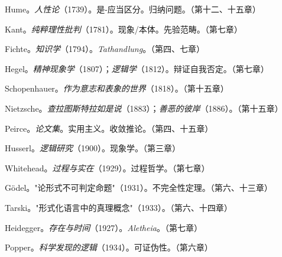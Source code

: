 \documentclass[10pt, openany, oneside]{book}
\begin{document}
{\noindent Hume。\textit{人性论}（1739）。是-应当区分。归纳问题。（第十二、十五章）

\vspace{0.3em}

\noindent Kant。\textit{纯粹理性批判}（1781）。现象/本体。先验范畴。（第七章）

\vspace{0.3em}

\noindent Fichte。\textit{知识学}（1794）。\textit{Tathandlung}。（第四、七章）

\vspace{0.3em}

\noindent Hegel。\textit{精神现象学}（1807）；\textit{逻辑学}（1812）。辩证自我否定。（第七章）

\vspace{0.3em}

\noindent Schopenhauer。\textit{作为意志和表象的世界}（1818）。（第十五章）

\vspace{0.3em}

\noindent Nietzsche。\textit{查拉图斯特拉如是说}（1883）；\textit{善恶的彼岸}（1886）。（第十五章）

\vspace{0.3em}

\noindent Peirce。\textit{论文集}。实用主义。收敛推论。（第四、十五章）

\vspace{0.3em}

\noindent Husserl。\textit{逻辑研究}（1900）。现象学。（第三章）

\vspace{0.3em}

\noindent Whitehead。\textit{过程与实在}（1929）。过程哲学。（第七章）

\vspace{0.3em}

\noindent G\"{o}del。"论形式不可判定命题"（1931）。不完全性定理。（第六、十三章）

\vspace{0.3em}

\noindent Tarski。"形式化语言中的真理概念"（1933）。（第六、十四章）

\vspace{0.3em}

\noindent Heidegger。\textit{存在与时间}（1927）。\textit{Aletheia}。（第七章）

\vspace{0.3em}

\noindent Popper。\textit{科学发现的逻辑}（1934）。可证伪性。（第六章）

}
\end{document}
